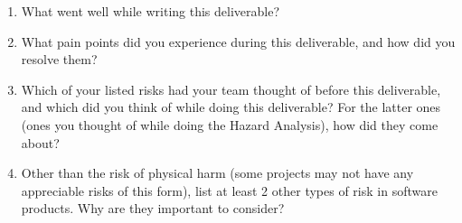\documentclass{article}
\begin{document}
\begin{enumerate}
    \item What went well while writing this deliverable? 
    \item What pain points did you experience during this deliverable, and how
    did you resolve them?
    \item Which of your listed risks had your team thought of before this
    deliverable, and which did you think of while doing this deliverable? For
    the latter ones (ones you thought of while doing the Hazard Analysis), how
    did they come about?
    \item Other than the risk of physical harm (some projects may not have any
    appreciable risks of this form), list at least 2 other types of risk in
    software products. Why are they important to consider?
\end{enumerate}
\end{document}
